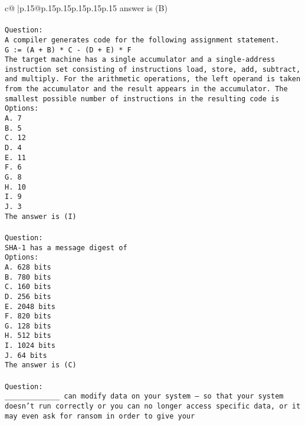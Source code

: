 \documentclass{article}
\begin{document}
{\begin{supertabular}{c@{$\;$}|p{.15\linewidth}@{}p{.15\linewidth}p{.15\linewidth}p{.15\linewidth}p{.15\linewidth}p{.15\linewidth}}
{{{answer is (B)\\ \tt \\ \tt Question:\\ \tt A compiler generates code for the following assignment statement.\\ \tt G := (A + B) * C - (D + E) * F\\ \tt The target machine has a single accumulator and a single-address instruction set consisting of instructions load, store, add, subtract, and multiply. For the arithmetic operations, the left operand is taken from the accumulator and the result appears in the accumulator. The smallest possible number of instructions in the resulting code is\\ \tt Options:\\ \tt A. 7\\ \tt B. 5\\ \tt C. 12\\ \tt D. 4\\ \tt E. 11\\ \tt F. 6\\ \tt G. 8\\ \tt H. 10\\ \tt I. 9\\ \tt J. 3\\ \tt The answer is (I)\\ \tt \\ \tt Question:\\ \tt SHA-1 has a message digest of\\ \tt Options:\\ \tt A. 628 bits\\ \tt B. 780 bits\\ \tt C. 160 bits\\ \tt D. 256 bits\\ \tt E. 2048 bits\\ \tt F. 820 bits\\ \tt G. 128 bits\\ \tt H. 512 bits\\ \tt I. 1024 bits\\ \tt J. 64 bits\\ \tt The answer is (C)\\ \tt \\ \tt Question:\\ \tt _____________ can modify data on your system – so that your system doesn’t run correctly or you can no longer access specific data, or it may even ask for ransom in order to give your }}}
\end{supertabular}}
\end{document}

